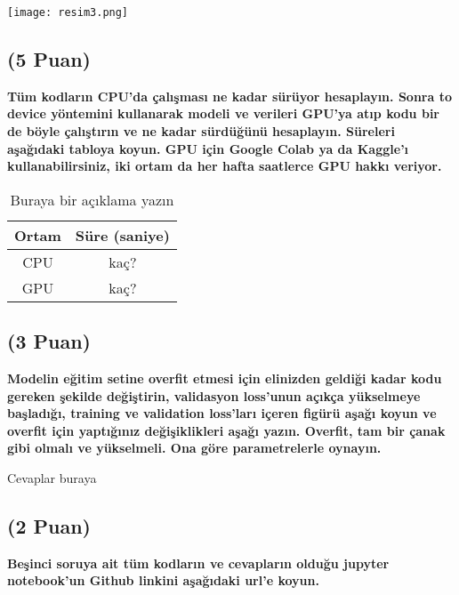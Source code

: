\documentclass[11pt]{article}
\begin{document}
\begin{center}
    \centering
    \texttt{[image: resim3.png]}
    \label{fig:my_pic}
\end{center}

\subsection{(5 Puan)} \textbf{Tüm kodların CPU'da çalışması ne kadar sürüyor hesaplayın. Sonra to device yöntemini kullanarak modeli ve verileri GPU'ya atıp kodu bir de böyle çalıştırın ve ne kadar sürdüğünü hesaplayın. Süreleri aşağıdaki tabloya koyun. GPU için Google Colab ya da Kaggle'ı kullanabilirsiniz, iki ortam da her hafta saatlerce GPU hakkı veriyor.}

\begin{table}[ht!]
    \centering
    \caption{Buraya bir açıklama yazın}
    \begin{tabular}{c|c}
        Ortam & Süre (saniye) \\\hline
        CPU & kaç? \\
        GPU & kaç?\\
    \end{tabular}
    \label{tab:my_table}
\end{table}

\subsection{(3 Puan)} \textbf{Modelin eğitim setine overfit etmesi için elinizden geldiği kadar kodu gereken şekilde değiştirin, validasyon loss'unun açıkça yükselmeye başladığı, training ve validation loss'ları içeren figürü aşağı koyun ve overfit için yaptığınız değişiklikleri aşağı yazın. Overfit, tam bir çanak gibi olmalı ve yükselmeli. Ona göre parametrelerle oynayın.}

Cevaplar buraya

\begin{comment}
\begin{figure}[ht!]
    \centering
    \texttt{[image: mypicturehere.png]}
    \caption{Buraya açıklama yazın}
    \label{fig:my_pic}
\end{figure}
\end{comment}

\subsection{(2 Puan)} \textbf{Beşinci soruya ait tüm kodların ve cevapların olduğu jupyter notebook'un Github linkini aşağıdaki url'e koyun.}
\end{document}

